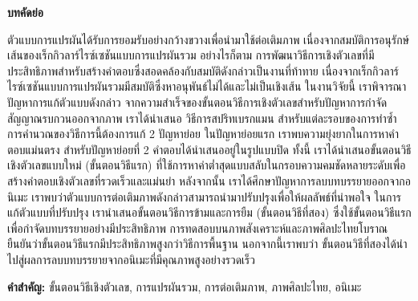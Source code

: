 \thispagestyle{empty}
\vspace{2 cm}
{\huge \bf บทคัดย่อ}

\vspace{2 cm}

\hspace{1cm} ตัวแบบการแปรผันได้รับการยอมรับอย่างกว้างขวางเพื่อนำมาใช้ต่อเติมภาพ เนื่องจากสมบัติการอนุรักษ์เส้นของเร็กกิวลาร์ไรซ์เซชันแบบการแปรผันรวม อย่างไรก็ตาม การพัฒนาวิธีการเชิงตัวเลขที่มีประสิทธิภาพสำหรับสร้างคำตอบซึ่งสอดคล้องกับสมบัติดังกล่าวเป็นงานที่ท้าทาย เนื่องจากเร็กกิวลาร์ไรซ์เซชันแบบการแปรผันรวมมีสมบัติซึ่งหาอนุพันธ์ไม่ได้และไม่เป็นเชิงเส้น ในงานวิจัยนี้ เราพิจารณาปัญหาการแก้ตัวแบบดังกล่าว จากความสำเร็จของขั้นตอนวิธีการเชิงตัวเลขสำหรับปัญหาการกำจัดสัญญาณรบกวนออกจากภาพ เราได้นำเสนอ \break วิธีการสปริทเบรกแมน สำหรับแต่ละรอบของการทำซ้ำ การคำนวณของวิธีการนี้ต้องการแก้ 2 ปัญหาย่อย ในปัญหาย่อยแรก เราพบความยุ่งยากในการหาคำตอบแม่นตรง สำหรับปัญหาย่อยที่ 2 คำตอบได้นำเสนออยู่ในรูปแบบปิด ทั้งนี้ เราได้นำเสนอขั้นตอนวิธีเชิงตัวเลขแบบใหม่ (ขั้นตอนวิธีแรก) ที่ใช้การหาค่าต่ำสุดแบบสลับในกรอบความคมชัดหลายระดับเพื่อสร้างคำตอบเชิงตัวเลขที่รวดเร็วและแม่นยำ หลังจากนั้น เราได้ศึกษาปัญหาการลบบทบรรยายออกจากอนิเมะ เราพบว่าตัวแบบการต่อเติมภาพดังกล่าวสามารถนำมาปรับปรุงเพื่อให้ผลลัพธ์ที่น่าพอใจ ในการแก้ตัวแบบที่ปรับปรุง เรานำเสนอขั้นตอนวิธีการข้ามและการยืม (ขั้นตอนวิธีที่สอง) ซึ่งใช้ขั้นตอนวิธีแรกเพื่อกำจัดบทบรรยายอย่างมีประสิทธิภาพ การทดสอบบนภาพสังเคราะห์และภาพศิลปะไทยโบราณยืนยันว่าขั้นตอนวิธีแรกมีประสิทธิภาพสูงกว่าวิธีการพื้นฐาน นอกจากนี้เราพบว่า ขั้นตอนวิธีที่สองได้นำไปสู่ผลการลบบทบรรยายจากอนิเมะที่มีคุณภาพสูงอย่างรวดเร็ว

\vspace{1 cm}
{\bf{คำสำคัญ:}} ขั้นตอนวิธีเชิงตัวเลข, การแปรผันรวม, การต่อเติมภาพ, ภาพศิลปะไทย, อนิเมะ\\
\newpage